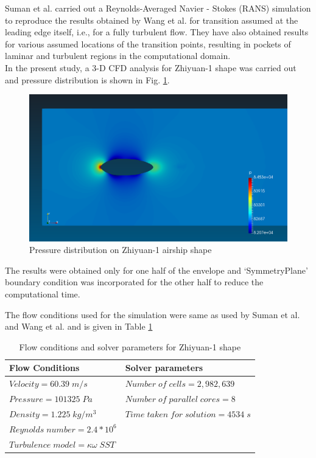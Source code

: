 Suman et al. \cite{Suman2011} carried out a Reynolds-Averaged Navier - Stokes (RANS) simulation to reproduce the results obtained by Wang et al. \cite{Wang2010} for transition assumed at the leading edge itself, i.e., for a fully turbulent flow. They have also obtained results for various assumed locations of the transition points, resulting in pockets of laminar and turbulent regions in the computational domain.\\
In the present study, a 3-D CFD analysis for Zhiyuan-1 shape was carried out and pressure distribution is shown in Fig. \ref {fig:Zhiyuan-1 pressure}. 
\begin{figure}[H]
	\centering
	\includegraphics[width=300 pt]{rnd/pressure_zhiyuan.png}
	\caption{Pressure distribution on Zhiyuan-1 airship shape}
	\label{fig:Zhiyuan-1 pressure} %
\end{figure}

The results were obtained only for one half of the envelope and `SymmetryPlane' boundary condition was incorporated for the other half to reduce the computational time.

The flow conditions used for the simulation were same as used by Suman et al. \cite{Suman2011} and Wang et al. \cite{Wang2010} and is given in Table \ref{Flow conditions and solver parametres for Zhiyuan-1 shape}

\begin{table}[H]
	\caption{Flow conditions and solver parameters for Zhiyuan-1 shape}
	\label{Flow conditions and solver parametres for Zhiyuan-1 shape}
	\centering
	\begin{tabular}{ll}
		\hline \hline
		Flow Conditions & Solver parameters  \\ \hline \hline
		
		$ Velocity = 60.39 \; m/s$ & $Number \; of \; cells = 2,982,639$    \\  
		$ Pressure = 101325 \; Pa $ & $ Number \; of \; parallel \; cores = 8 $     \\
		$ Density = 1.225 \; kg/m^{3} $ & $ Time \; taken \; for \; solution = 4534 \; s  $    \\
		$ Reynolds \; number = 2.4 * 10^{6} $ &    \\
		$ Turbulence \; model = \kappa \omega \; SST $ &     \\
		\hline
	\end{tabular}
\end{table}


